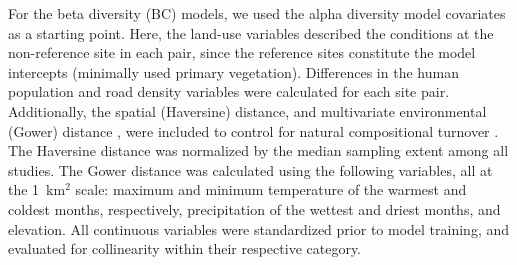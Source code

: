 For the beta diversity (BC) models, we used the alpha diversity model covariates as a starting point. Here, the land-use variables described the conditions at the non-reference site in each pair, since the reference sites constitute the model intercepts (minimally used primary vegetation). Differences in the human population and road density variables were calculated for each site pair. Additionally, the spatial (Haversine) distance, and multivariate environmental (Gower) distance \cite{gower1971}, were included to control for natural compositional turnover \cite{depalma2021}. The Haversine distance was normalized by the median sampling extent among all studies. The Gower distance was calculated using the following variables, all at the 1~km$^2$ scale: maximum and minimum temperature of the warmest and coldest months, respectively, precipitation of the wettest and driest months, and elevation. All continuous variables were standardized prior to model training, and evaluated for collinearity within their respective category.
\vspace{\baselineskip}
